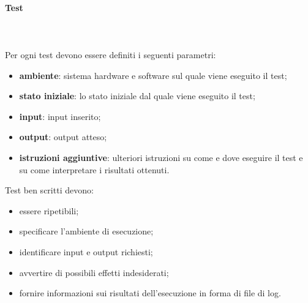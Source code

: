 		\paragraph{Test} \mbox{}\\ \mbox{}\\
		Per ogni test devono essere definiti i seguenti parametri:
		\begin{itemize}
			\item \textbf{ambiente}: sistema hardware e software sul quale viene eseguito il test;
			\item \textbf{stato iniziale}: lo stato iniziale dal quale  viene eseguito il test;
			\item \textbf{input}: input inserito;
			\item \textbf{output}: output atteso;
			\item \textbf{istruzioni aggiuntive}: ulteriori istruzioni su come e dove eseguire il test e su come interpretare i risultati ottenuti.
		\end{itemize}
		Test ben scritti devono:
		\begin{itemize}
			\item essere ripetibili;
			\item specificare l'ambiente di esecuzione;
			\item identificare input e output richiesti;
			\item avvertire di possibili effetti indesiderati;
			\item fornire informazioni sui risultati dell'esecuzione in forma di file di log.
		\end{itemize}	
			
